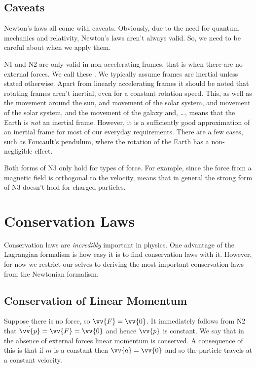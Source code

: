 \documentclass[fleqn]{NotesClass}
\begin{document}
    \subsection{Caveats}
    Newton's laws all come with caveats.
    Obviously, due to the need for quantum mechanics and relativity, Newton's laws aren't always valid.
    So, we need to be careful about when we apply them.
    
    N1 and N2 are only valid in non-accelerating frames, that is when there are no external forces.
    We call these .
    We typically assume frames are inertial unless stated otherwise.
    Apart from linearly accelerating frames it should be noted that rotating frames aren't inertial, even for a constant rotation speed.
    This, as well as the movement around the sun, and movement of the solar system, and movement of the solar system, and the movement of the galaxy and, \dots, means that the Earth is \emph{not} an inertial frame.
    However, it is a sufficiently good approximation of an inertial frame for most of our everyday requirements.
    There are a few cases, such as Foucault's pendulum, where the rotation of the Earth has a non-negligible effect.
    
    Both forms of N3 only hold for types of force.
    For example, since the force from a magnetic field is orthogonal to the velocity, means that in general the strong form of N3 doesn't hold for charged particles.
    
    \section{Conservation Laws}
    Conservation laws are \emph{incredibly} important in physics.
    One advantage of the Lagrangian formalism is how easy it is to find conservation laws with it.
    However, for now we restrict our selves to deriving the most important conservation laws from the Newtonian formalism.
    
    \subsection{Conservation of Linear Momentum}
    Suppose there is no force, so \(\vv{F} = \vv{0}\).
    It immediately follows from N2 that \(\dot{\vv{p}} = \vv{F} = \vv{0}\) and hence \(\vv{p}\) is constant.
    We say that in the absence of external forces linear momentum is conserved.
    A consequence of this is that if \(m\) is a constant then \(\vv{a} = \vv{0}\) and so the particle travels at a constant velocity.
    
\end{document}
